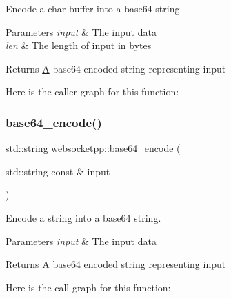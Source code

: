 Encode a char buffer into a base64 string. 


\begin{DoxyParams}{Parameters}
{\em input} & The input data \\
\hline
{\em len} & The length of input in bytes \\
\hline
\end{DoxyParams}
\begin{DoxyReturn}{Returns}
\mbox{\hyperlink{struct_a}{A}} base64 encoded string representing input 
\end{DoxyReturn}
Here is the caller graph for this function\+:
\mbox{\label{namespacewebsocketpp_a3a167489f63491475d0069204edf71da}} 
\subsubsection{\texorpdfstring{base64\+\_\+encode()}{base64\_encode()}\hspace{0.1cm}{\footnotesize\ttfamily [2/2]}}
{\footnotesize\ttfamily std\+::string websocketpp\+::base64\+\_\+encode (\begin{DoxyParamCaption}\item[{std\+::string const \&}]{input }\end{DoxyParamCaption})\hspace{0.3cm}{\ttfamily [inline]}}



Encode a string into a base64 string. 


\begin{DoxyParams}{Parameters}
{\em input} & The input data \\
\hline
\end{DoxyParams}
\begin{DoxyReturn}{Returns}
\mbox{\hyperlink{struct_a}{A}} base64 encoded string representing input 
\end{DoxyReturn}
Here is the call graph for this function\+:
